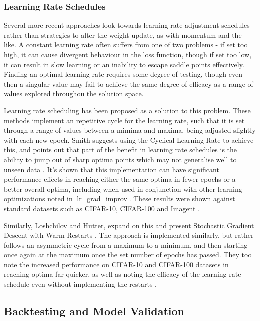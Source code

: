 \documentclass[a4paper,11pt,oneside]{article}
\theoremstyle{plain}
\theoremstyle{definition}
\begin{document}
\subsubsection{Learning Rate Schedules}

Several more recent approaches look towards learning rate adjustment schedules rather than strategies to alter the 
weight update, as with momentum and the like. A constant learning rate often suffers from one of two problems - 
if set too high, it can cause divergent behaviour in the loss function, though if set too low, it can result in slow 
learning or an inability to escape saddle points effectively. Finding an optimal learning rate requires some degree
of testing, though even then a singular value may fail to achieve the same degree of efficacy as a range of values 
explored throughou the solution space. \newline

Learning rate scheduling has been proposed as a solution to this problem. These methods implement an repetitive cycle 
for the learning rate, such that it is set through a range of values between a mimima and maxima, being adjusted slightly 
with each new epoch. Smith suggests using the Cyclical Learning Rate to achieve this, and points out that part of the benefit 
in learning rate schedules is the ability to jump out of sharp optima points which may not generalise well to unseen data \cite{Smith}. 
It's shown that this implementation can have significant performance effects in reaching either the same optima in fewer epochs or a better 
overall optima, including when used in conjunction with other learning optimizations noted in \ref{lr_grad_improv}. These results were 
shown against standard datasets such as CIFAR-10, CIFAR-100 and Imagent \cite{Smith}. \newline

Similarly, Loshchilov and Hutter, expand on this and present Stochastic Gradient Descent with Warm Restarts \cite{Loshchilov}. The approach is 
implemented similarly, but rather follows an asymmetric cycle from a maximum to a minimum, and then starting once again at the maximum once the set number 
of epochs has passed. They too note the increased performance on CIFAR-10 and CIFAR-100 datasets in reaching optima far quicker, as well as noting the efficacy of the 
learning rate schedule even without implementing the restarts \cite{Loshchilov}.



\subsection{Backtesting and Model Validation} \label{lr_backtesting}
\hfill
\end{document}
